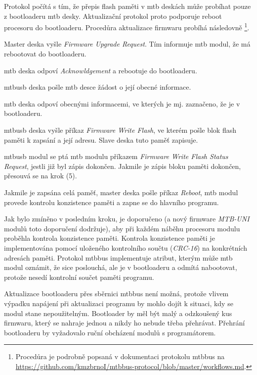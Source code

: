 Protokol počítá s tím, že přepis flash paměti v \gls{mtb} deskách může
probíhat pouze z bootloaderu \gls{mtb} desky. Aktualizační protokol proto
podporuje reboot procesoru do bootloaderu. Procedůra aktualizace firmwaru
probíhá následovně \footnote{Procedůra je podrobně popsaná v dokumentaci protokolu
\gls{mtbbus} na
\url{https://github.com/kmzbrnoI/mtbbus-protocol/blob/master/workflows.md}.}.

\begin{compactenum}
\item Master deska vyšle \textit{Firmware Upgrade Request}. Tím informuje \gls{mtb}
	modul, že má rebootovat do bootloaderu.
\item \gls{mtb} deska odpoví \textit{Acknowldgement} a rebootuje do bootloaderu.
\item \gls{mtbusb} deska pošle \gls{mtb} desce žádost o její obecné informace.
\item \gls{mtb} deska odpoví obecnými informacemi, ve kterých je mj. zaznačeno,
	že je v bootloaderu.
\item \gls{mtbusb} deska vyšle příkaz \textit{Firmware Write Flash}, ve kterém pošle
	blok flash paměti k zapsání a její adresu. Slave deska tuto paměť zapisuje.
\item \gls{mtbusb} modul se ptá \gls{mtb} modulu příkazem \textit{Firmware Write
	Flash Status Request}, jestli již byl zápis dokončen. Jakmile je zápis bloku
	paměti dokončen, přesouvá se na krok (5).
\item Jakmile je zapsána celá paměť, master deska pošle příkaz \textit{Reboot},
	\gls{mtb} modul provede kontrolu konzistence paměti a zapne se do hlavního
	programu.
\end{compactenum}

Jak bylo zmíněno v posledním kroku, je doporučeno (a nový firmware
\textit{MTB-UNI} modulů toto doporučení dodržuje), aby při každém náběhu
procesoru modulu proběhla kontrola konzistence paměti. Kontrola konzistence
paměti je implementována pomocí uloženého kontrolního součtu (\textit{CRC-16})
na konkrétních adresách paměti. Protokol \gls{mtbbus} implementuje atribut,
kterým může \gls{mtb} modul oznámit, že sice poslouchá, ale je v bootloaderu
a odmítá nabootovat, protože nesedí kontrolní součet paměti programu.

Aktualizace bootloaderu přes sběrnici \gls{mtbbus} není možná, protože vlivem
výpadku napájení při aktualizaci programu by mohlo dojít k situaci, kdy se modul
stane nepoužitelným. Bootloader by měl být malý a odzkoušený kus firmwaru, který
se nahraje jednou a nikdy ho nebude třeba přehrávat. Přehrání bootloaderu by
vyžadovalo ruční obcházení modulů s programátorem.
